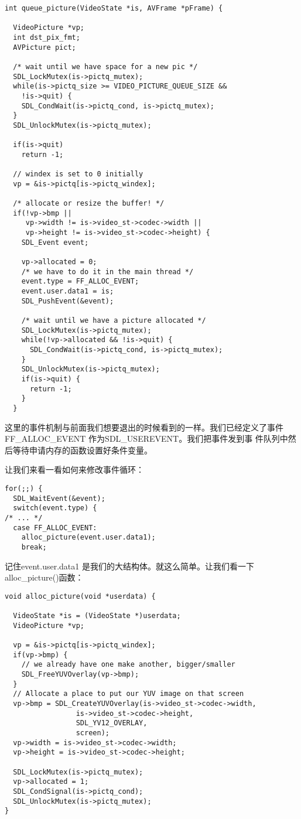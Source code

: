 \begin{lstlisting}
int queue_picture(VideoState *is, AVFrame *pFrame) {

  VideoPicture *vp;
  int dst_pix_fmt;
  AVPicture pict;

  /* wait until we have space for a new pic */
  SDL_LockMutex(is->pictq_mutex);
  while(is->pictq_size >= VIDEO_PICTURE_QUEUE_SIZE &&
    !is->quit) {
    SDL_CondWait(is->pictq_cond, is->pictq_mutex);
  }
  SDL_UnlockMutex(is->pictq_mutex);

  if(is->quit)
    return -1;

  // windex is set to 0 initially
  vp = &is->pictq[is->pictq_windex];

  /* allocate or resize the buffer! */
  if(!vp->bmp ||
     vp->width != is->video_st->codec->width ||
     vp->height != is->video_st->codec->height) {
    SDL_Event event;

    vp->allocated = 0;
    /* we have to do it in the main thread */
    event.type = FF_ALLOC_EVENT;
    event.user.data1 = is;
    SDL_PushEvent(&event);

    /* wait until we have a picture allocated */
    SDL_LockMutex(is->pictq_mutex);
    while(!vp->allocated && !is->quit) {
      SDL_CondWait(is->pictq_cond, is->pictq_mutex);
    }
    SDL_UnlockMutex(is->pictq_mutex);
    if(is->quit) {
      return -1;
    }
  }
\end{lstlisting}

这里的事件机制与前面我们想要退出的时候看到的一样。我们已经定义了事件FF_ALLOC_EVENT 作为SDL_USEREVENT。我们把事件发到事 件队列中然后等待申请内存的函数设置好条件变量。

让我们来看一看如何来修改事件循环：
\begin{lstlisting}
for(;;) {
  SDL_WaitEvent(&event);
  switch(event.type) {
/* ... */
  case FF_ALLOC_EVENT:
    alloc_picture(event.user.data1);
    break;
\end{lstlisting}

记住event.user.data1 是我们的大结构体。就这么简单。让我们看一下alloc_picture()函数：

\begin{lstlisting}
void alloc_picture(void *userdata) {

  VideoState *is = (VideoState *)userdata;
  VideoPicture *vp;

  vp = &is->pictq[is->pictq_windex];
  if(vp->bmp) {
    // we already have one make another, bigger/smaller
    SDL_FreeYUVOverlay(vp->bmp);
  }
  // Allocate a place to put our YUV image on that screen
  vp->bmp = SDL_CreateYUVOverlay(is->video_st->codec->width,
                 is->video_st->codec->height,
                 SDL_YV12_OVERLAY,
                 screen);
  vp->width = is->video_st->codec->width;
  vp->height = is->video_st->codec->height;

  SDL_LockMutex(is->pictq_mutex);
  vp->allocated = 1;
  SDL_CondSignal(is->pictq_cond);
  SDL_UnlockMutex(is->pictq_mutex);
}
\end{lstlisting}

